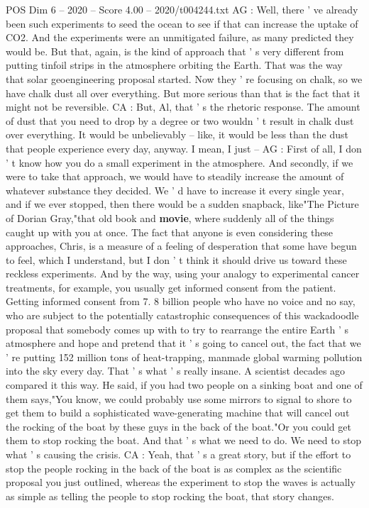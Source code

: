\begin{textsample}{POS Dim 6 – 2020 – Score 4.00 – 2020/t004244.txt}
AG : Well, there ' ve already been such experiments to seed the ocean to see if that can increase the uptake of CO2.
And the experiments were an unmitigated failure, as many predicted they would be.
But that, again, is the kind of approach that ' s very different from putting tinfoil strips in the atmosphere orbiting the Earth.
That was the way that solar geoengineering proposal started.
Now they ' re focusing on chalk, so we have chalk dust all over everything.
But more serious than that is the fact that it might not be reversible.
CA : But, Al, that ' s the rhetoric response.
The amount of dust that you need to drop by a degree or two wouldn ' t result in chalk dust over everything.
It would be unbelievably -- like, it would be less than the dust that people experience every day, anyway.
I mean, I just -- AG : First of all, I don ' t know how you do a small experiment in the atmosphere.
And secondly, if we were to take that approach, we would have to steadily increase the amount of whatever substance they decided.
We ' d have to increase it every single year, and if we ever stopped, then there would be a sudden snapback, like"The Picture of Dorian Gray,"that old book and \textbf{movie}, where suddenly all of the things caught up with you at once.
The fact that anyone is even considering these approaches, Chris, is a measure of a feeling of desperation that some have begun to feel, which I understand, but I don ' t think it should drive us toward these reckless experiments.
And by the way, using your analogy to experimental cancer treatments, for example, you usually get informed consent from the patient.
Getting informed consent from 7. 8 billion people who have no voice and no say, who are subject to the potentially catastrophic consequences of this wackadoodle proposal that somebody comes up with to try to rearrange the entire Earth ' s atmosphere and hope and pretend that it ' s going to cancel out, the fact that we ' re putting 152 million tons of heat-trapping, manmade global warming pollution into the sky every day.
That ' s what ' s really insane.
A scientist decades ago compared it this way.
He said, if you had two people on a sinking boat and one of them says,"You know, we could probably use some mirrors to signal to shore to get them to build a sophisticated wave-generating machine that will cancel out the rocking of the boat by these guys in the back of the boat."Or you could get them to stop rocking the boat.
And that ' s what we need to do.
We need to stop what ' s causing the crisis.
CA : Yeah, that ' s a great story, but if the effort to stop the people rocking in the back of the boat is as complex as the scientific proposal you just outlined, whereas the experiment to stop the waves is actually as simple as telling the people to stop rocking the boat, that story changes.

\end{textsample}
